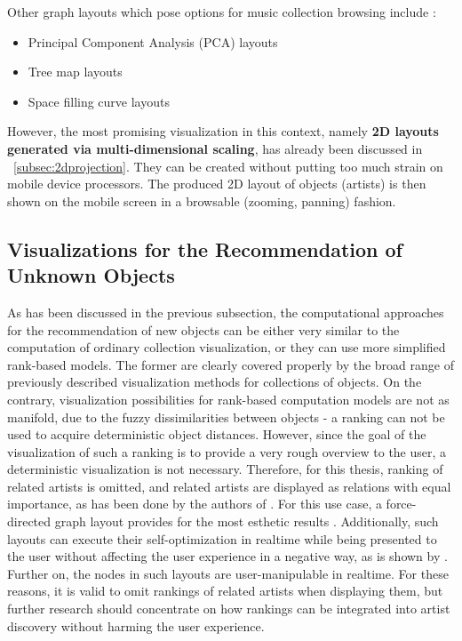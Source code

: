 Other graph layouts which pose options for music collection browsing include \cite{Muelder:2010fk}:

\begin{itemize}
	\item Principal Component Analysis (PCA) layouts 
	\item Tree map layouts 
	\item Space filling curve layouts
\end{itemize}

However, the most promising visualization in this context, namely \textbf{2D layouts generated via multi-dimensional scaling}, has already been discussed in ~\ref{subsec:2dprojection}. They can be created without putting too much strain on mobile device processors. The produced 2D layout of objects (artists) is then shown on the mobile screen in a browsable (zooming, panning) fashion.

\subsection{Visualizations for the Recommendation of Unknown Objects}

As has been discussed in the previous subsection, the computational approaches for the recommendation of new objects can be either very similar to the computation of ordinary collection visualization, or they can use more simplified rank-based models. The former are clearly covered properly by the broad range of previously described visualization methods for collections of objects. On the contrary, visualization possibilities for rank-based computation models are not as manifold, due to the fuzzy dissimilarities between objects - a ranking can not be used to acquire deterministic object distances. However, since the goal of the visualization of such a ranking is to provide a very rough overview to the user, a deterministic visualization is not necessary. Therefore, for this thesis, ranking of related artists is omitted, and related artists are displayed as relations with equal importance, as has been done by the authors of \cite{DBLP:conf/webist/SarmentoGCO09}. For this use case, a force-directed graph layout provides for the most esthetic results \cite{DBLP:journals/spe/FruchtermanR91}. Additionally, such layouts can execute their self-optimization in realtime while being presented to the user without affecting the user experience in a negative way, as is shown by \cite{url:tuneglue}. Further on, the nodes in such layouts are user-manipulable in realtime. For these reasons, it is valid to omit rankings of related artists when displaying them, but further research should concentrate on how rankings can be integrated into artist discovery without harming the user experience.

